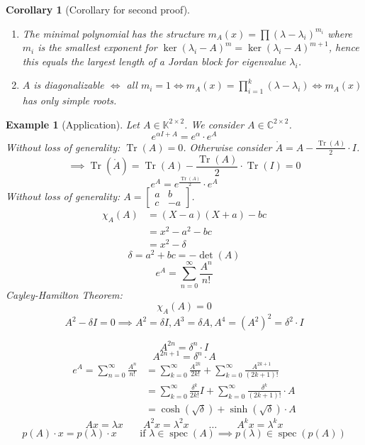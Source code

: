 \documentclass[a4paper]{article}
\newcounter{lecref}[section]
\numberwithin{lecref}{section}
\newtheorem{example}[lecref]{Example}
\newtheorem{corollary}[lecref]{Corollary}
\begin{document}
\begin{corollary}[Corollary for second proof]\hfill{} %
  \begin{enumerate}
    \item The minimal polynomial has the structure $m_A(x) = \prod (\lambda - \lambda_i)^{m_i}$ where $m_i$ is the smallest exponent for $\ker(\lambda_i - A)^m = \ker(\lambda_i - A)^{m+1}$, hence this equals the largest length of a Jordan block for eigenvalue $\lambda_i$.
    \item $A$ is diagonalizable $\iff$ all $m_i = 1 \iff m_A(x) = \prod_{i=1}^k (\lambda - \lambda_i) \iff m_A(x)$ has only simple roots.
  \end{enumerate}
\end{corollary}

\begin{example}[Application] %
  Let $A \in \mathbb K^{2\times 2}$. We consider $A \in \mathbb C^{2 \times 2}$.
  \[ e^{\alpha I + A} = e^{\alpha} \cdot e^A \]
  Without loss of generality: $\operatorname{Tr}(A) = 0$. Otherwise consider $\mathring{A} = A - \frac{\operatorname{Tr}(A)}{2} \cdot I$.
  \[ \implies \operatorname{Tr}(\mathring{A}) = \operatorname{Tr}(A) - \frac{\operatorname{Tr}(A)}{2} \cdot \operatorname{Tr}(I) = 0 \]
  \[ e^A = e^{\frac{\operatorname{Tr}(A)}{2}} \cdot e^A \]
  Without loss of generality: $A = \begin{bmatrix} a & b \\ c & -a \end{bmatrix}$.
  \begin{align*}
    \chi_A(A) &= (X - a)(X + a) - bc \\
      &= x^2 - a^2 - bc \\
      &= x^2 - \delta
  \end{align*}
  \[ \delta = a^2 + bc = -\det(A) \]
  \[ e^A = \sum_{n=0}^\infty \frac{A^n}{n!} \]
  Cayley-Hamilton Theorem:
  \[ \chi_A(A) = 0 \]
  \[ A^2 - \delta I = 0 \implies A^2 = \delta I, A^3 = \delta A, A^4 = (A^2)^2 = \delta^2 \cdot I \]

  \[ A^{2n} = \delta^n \cdot I \]
  \[ A^{2n+1} = \delta^n \cdot A \]
  \begin{align*}
    e^A = \sum_{n=0}^\infty \frac{A^n}{n!}
        &= \sum_{k=0}^\infty \frac{A^{2k}}{2k!} + \sum_{k=0}^\infty \frac{A^{2k+1}}{(2k+1)!} \\
        &= \sum_{k=0}^\infty \frac{\delta^k}{2k!} I + \sum_{k=0}^\infty \frac{\delta^k}{(2k+1)!} \cdot A \\
        &= \cosh\left(\sqrt\delta\right) + \sinh(\sqrt\delta) \cdot A
  \end{align*}
  \[ Ax = \lambda x \qquad A^2x = \lambda^2 x \qquad \dots \qquad A^kx = \lambda^k x \]
  \[ p(A) \cdot x = p(\lambda) \cdot x \qquad \text{ if } \lambda \in \operatorname{spec}(A) \implies p(\lambda) \in \operatorname{spec}(p(A)) \]
\end{example}
\end{document}
